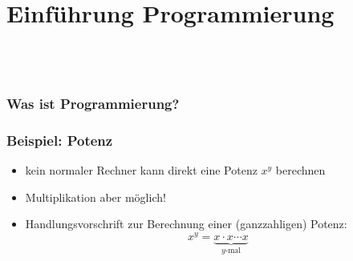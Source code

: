 
    \section{Einführung Programmierung}\subsection{~}
    \begin{frame}
        \frametitle{Was ist Programmierung?}
        \begin{center}\end{center}
    \end{frame}

    \begin{frame}
        \frametitle{Beispiel: Potenz}
        \begin{itemize}
            \item kein normaler Rechner kann direkt eine Potenz $x^y$ berechnen
            \pause
            \item Multiplikation aber möglich!
            \pause
            \item Handlungsvorschrift zur Berechnung einer (ganzzahligen) Potenz:
            \begin{equation*}
                x^y = \underbrace{x \cdot x \cdots x}_\text{$y$-mal}
            \end{equation*}
        \end{itemize}
    \end{frame}


